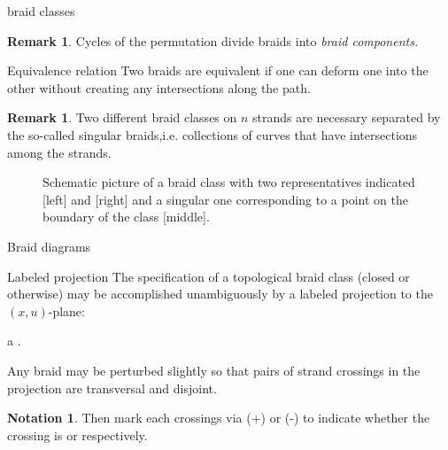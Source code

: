 \documentclass[9pt, english]{beamer}
\theoremstyle{definition}
\newtheorem{oss}[thm]{Remark}
\newtheorem{notation}[thm]{Notation}
\begin{document}
\begin{frame}{braid classes}
    \begin{oss}
        Cycles of the permutation divide braids into {\em braid
        components.\/}
    \end{oss}\pause
    \begin{block}{Equivalence relation}
        Two braids are equivalent if one can deform one into the other
        without creating any intersections along the path.\pause\\
        \color{blue}{Thus a braid class is the equivalence class of isotopic
        braids.}
    \end{block}\pause
    \begin{oss}
        Two different braid classes on $n$ strands are necessary
        separated by the so-called \alert{singular braids},\pause i.e.
        collections of curves that {\color{red}{do}\/} have intersections
        among the strands.
    \end{oss}
\end{frame}
\begin{frame}
\begin{figure}\label{fig:singular}
        \caption{Schematic picture of a braid class with two representatives indicated
        [left] and [right] and a singular one corresponding to a point on the boundary of the class [middle].}
        \end{figure}
\end{frame}
\begin{frame}{Braid diagrams }
    \begin{block}{Labeled projection}\pause
        The specification of a topological braid class \pause (closed or
        otherwise) may be accomplished unambiguously by a labeled
        projection to the $(x,u)$-plane:

        a {\color{red}{ braid diagram}\/}.\pause

        Any braid may be perturbed slightly so that pairs of strand
        crossings in the projection are transversal and disjoint.\pause
    \end{block}
        \begin{notation}
        Then mark each crossings via (+) or (-) to indicate whether the
        crossing is {\color{red}{bottom over top}\/} or {\em \color{red}{top over bottom}\/}
        respectively.\pause

        {\color{blue}{Since we are dealing with Legendrian braids all crossings have
        positive labels.}\/}
        \end{notation}
\end{frame}
\end{document}
